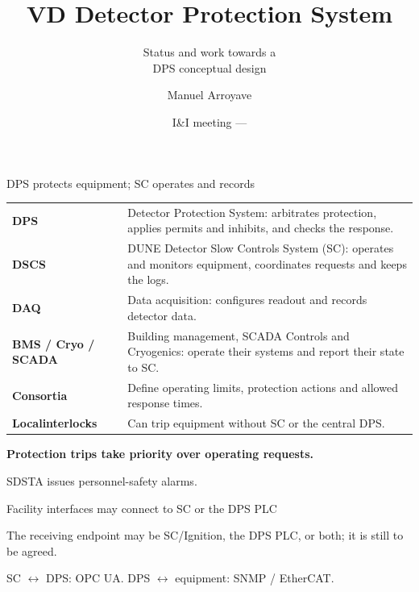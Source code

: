 \documentclass[aspectratio=169,11pt]{beamer}
\title{VD Detector Protection System}
\subtitle{Status and work towards a \\ DPS conceptual design}
\author{Manuel Arroyave}
\date{I\&I meeting --- \DpsMeetingDate}
\begin{document}
\begin{frame}[plain]
  \titlepage
\end{frame}

\DpsKnownAndMissing

\begin{frame}{DPS protects equipment; SC operates and records}
\renewcommand{\arraystretch}{1.18}
\begin{tabularx}{\textwidth}{@{}>{\RaggedRight\arraybackslash}p{2.2cm}>{\RaggedRight\arraybackslash}X@{}}
\textbf{DPS} & Detector Protection System: arbitrates protection, applies permits and inhibits, and checks the response.\\
    \textbf{DSCS} & DUNE Detector Slow Controls System (SC): operates and monitors equipment, coordinates requests and keeps the logs.\\
\textbf{DAQ} & Data acquisition: configures readout and records detector data.\\
\textbf{BMS / Cryo / SCADA} & Building management, SCADA Controls and Cryogenics: operate their systems and report their state to SC.\\
\textbf{Consortia} & Define operating limits, protection actions and allowed response times.\\
\textbf{Local\newline interlocks} & Can trip equipment without SC or the central DPS.\\
\end{tabularx}\par\bigskip
\textbf{Protection trips take priority over operating requests.}\par\medskip
SDSTA issues personnel-safety alarms.
\end{frame}


\begin{frame}{Facility interfaces may connect to SC or the DPS PLC}
\centering
{}\par\smallskip
\raggedright{}\par\smallskip
\raggedright

The receiving endpoint may be SC/Ignition, the DPS PLC, or both; it is still to be agreed.\par\smallskip
SC $\leftrightarrow$ DPS: OPC UA. DPS $\leftrightarrow$ equipment: SNMP / EtherCAT.
\end{frame}
\end{document}
